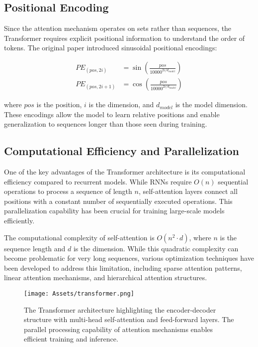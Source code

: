 \subsection{Positional Encoding}

Since the attention mechanism operates on sets rather than sequences, the Transformer requires explicit positional information to understand the order of tokens. The original paper introduced sinusoidal positional encodings:

\begin{align}
PE_{(pos, 2i)} &= \sin\left(\frac{pos}{10000^{2i/d_{model}}}\right) \\
PE_{(pos, 2i+1)} &= \cos\left(\frac{pos}{10000^{2i/d_{model}}}\right)
\end{align}

where $pos$ is the position, $i$ is the dimension, and $d_{model}$ is the model dimension. These encodings allow the model to learn relative positions and enable generalization to sequences longer than those seen during training.

\subsection{Computational Efficiency and Parallelization}

One of the key advantages of the Transformer architecture is its computational efficiency compared to recurrent models. While RNNs require $O(n)$ sequential operations to process a sequence of length $n$, self-attention layers connect all positions with a constant number of sequentially executed operations. This parallelization capability has been crucial for training large-scale models efficiently.

The computational complexity of self-attention is $O(n^2 \cdot d)$, where $n$ is the sequence length and $d$ is the dimension. While this quadratic complexity can become problematic for very long sequences, various optimization techniques have been developed to address this limitation, including sparse attention patterns, linear attention mechanisms, and hierarchical attention structures.

\begin{figure}[H]
    \centering
    \texttt{[image: Assets/transformer.png]}
    \caption{The Transformer architecture highlighting the encoder-decoder structure with multi-head self-attention and feed-forward layers. The parallel processing capability of attention mechanisms enables efficient training and inference. \cite{EncoderDecoderStructure}}
    \label{fig:transformer_architecture}
\end{figure}

